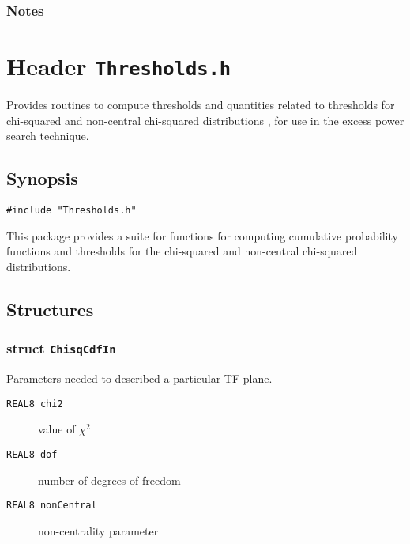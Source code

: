 \subsubsection*{Notes}

\vfill{\footnotesize}



%
%
%
%
%
%
%
%




\newpage
\section{Header \texttt{Thresholds.h}}
\label{s:Thresholds.h}

\noindent Provides routines to compute thresholds and quantities related to
thresholds for chi-squared and non-central chi-squared distributions
\cite{ptvf:1992}, for use in the excess power search technique.

\subsection*{Synopsis}
\begin{verbatim}
#include "Thresholds.h"
\end{verbatim}

\noindent This package provides a suite for functions for computing cumulative
probability functions and thresholds for the chi-squared and non-central
chi-squared distributions.

\subsection*{Structures}

\subsubsection*{struct \texttt{ChisqCdfIn}}

\noindent Parameters needed to described a particular TF plane.

\begin{description}
\item[\texttt{REAL8     chi2}] value of $\chi^2$
\item[\texttt{REAL8     dof}]  number of degrees of freedom
\item[\texttt{REAL8     nonCentral}]  non-centrality parameter
\end{description}

